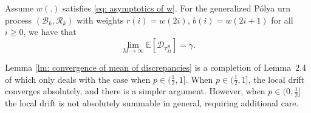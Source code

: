 \documentclass[EJP]{ejpecp} %
\begin{document}
\begin{lemma} \label{lm: convergence of mean of discrepancies}
	Assume $w(.)$ satisfies \eqref{eq: asymptotics of w}.
	For the generalized P\'{o}lya urn process $(\mathscr{B}_{k},\mathscr{R}_{k})$ with weights $r(i)= w(2i)$, $b(i) = w(2i+1)$ for all $i\geq 0$, we have that
	\[
	\lim_{M\to\infty} \mathbb{E}[\mathscr{D}_{\tau_M^{\mathscr{B}}}] = \gamma. 
	\]
\end{lemma} 
\begin{remark}
	Lemma \ref{lm: convergence of mean of discrepancies} is a completion of Lemma~2.4 of \cite{KMP23} which only deals with the case when ${p \in (\frac{1}{2}, 1]}$. When $p \in (\frac{1}{2}, 1]$, the local drift converges absolutely, and there is a simpler argument. However, when $p \in (0,\frac{1}{2}]$ the local drift is not absolutely summable in general, requiring additional care.
\end{remark}
\end{document}
